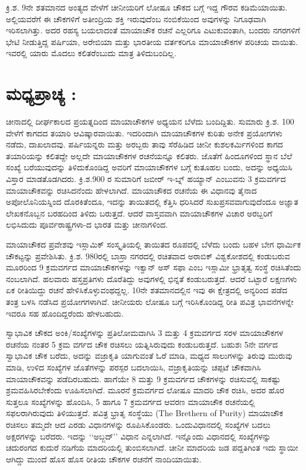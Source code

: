 ಕ್ರಿ.ಶ. 9ನೇ ಶತಮಾನದ ಅಂತ್ಯದ ವೇಳೆಗೆ ಚೀನೀಯರಿಗೆ ಲೋಷೂ ಚೌಕದ ಬಗ್ಗೆ ಇದ್ದ ಗೌರವ ಕಡಿಮೆಯಾಯಿತು. ಅಲ್ಲಿಯವರೆಗೆ ಈ ಚೌಕಗಳಿಗೆ ಅತೀಂದ್ರಿಯ ಶಕ್ತಿ ಇರುವುದೆಂಬ ನಂಬಿಕೆಯಿಂದ ಅವುಗಳನ್ನು ನಿಗೂಢವಾಗಿ ಇರಿಸಲಾಗಿತ್ತು. ಅದರ ರಹಸ್ಯ ಬಯಲಾದಂತೆ ಮಾಯಾಚೌಕ ರಚನೆ ಎಲ್ಲರಿಗೂ ಎಟುಕುವಂತಾಗಿ, ಬಂದರು ನಗರಗಳಿಗೆ ಭೇಟಿ ನೀಡುತ್ತಿದ್ದ ಪರ್ಷಿಯಾ, ಅರೇಬಿಯಾ ಮತ್ತು ಭಾರತೀಯ ವರ್ತಕರಿಗೂ ಮಾಯಾಚೌಕಗಳ ಪರಿಚಯ ವಾಯಿತು. ಇವರಲ್ಲಿ ಯಾರು ಮೊದಲು ಕಲಿತರೆಂಬುದು ಮಾತ್ರ ತಿಳಿದುಬಂದಿಲ್ಲ.

\section*{ಮಧ್ಯಪ್ರಾಚ್ಯ :}

ಚೀನಾದಲ್ಲಿ ದೀರ್ಘಕಾಲದ ಪ್ರಯತ್ನದಿಂದ ಮಾಯಾಚೌಕಗಳ ಅಧ್ಯಯನ ಬೆಳೆದು ಬಂದಿದ್ದಿತು. ಸುಮಾರು ಕ್ರಿ.ಶ. 100 ವೇಳೆಗೆ ಕಾಗದದ ತಯಾರಿ ಆವಿಷ್ಕಾರವಾಯಿತು. ಇದರಿಂದಾಗಿ ಮಾಯಾಚೌಕಗಳ ಕುರಿತು ಅನೇಕ ಪ್ರಯೋಗಗಳು ನಡೆದು, ದಾಖಲಾದವು. ಪರ್ಷಿಯನ್ನರು ಮತ್ತು ಅರಬ್ಬರು ತಾವು ಸೆರೆಹಿಡಿದ ಚೀನೀ ಕುಶಲಕರ್ಮಿಗಳಿಂದ ಕಾಗದ ತಯಾರಿಯನ್ನು ಕಲಿತದ್ದೇ ಅಲ್ಲದೇ ಮಾಯಾಚೌಕಗಳ ರಚನೆಯನ್ನೂ ಕಲಿತರು. ಜೊತೆಗೆ ಹಿಂದೂಗಳಿಂದ ಸ್ಥಾನ ಬೆಲೆ ಸಂಖ್ಯೆ ಬರೆಯುವುದನ್ನು ತಿಳಿದುಕೊಂಡಿದ್ದ ಅವರಿಗೆ ಮಾಯಾಚೌಕಗಳ ಬಗ್ಗೆ ಕುತೂಹಲ ಬಂದು, ಅದನ್ನು ಅಧ್ಯಯಿಸಿ ವಿಸ್ತಾರ ಮಾಡತೊಡಗಿದರು. ಕ್ರಿ.ಶ.900 ರ ಸುಮಾರಿಗೆ ಜಬೀರ್ ಇ-ಬ್ನ್ ಹಯ್ಯಾನ್ ಎಂಬುವನು 3 ಕ್ರಮವರ್ಗದ ಮಾಯಾಚೌಕವನ್ನು ರಚಿಸಿದನೆಂದು ಹೇಳಲಾಗಿದೆ. ಮಾಯಾಚೌಕದ ರಚನೆಯ ಈ ವಿಧಾನವು ತೈನಾದ ಅಪೋಲೊನಿಯಸ್ನಿಂದ ದೊರಕಿತೆಂದೂ, ಇದನ್ನು ತಾಯಿತದಲ್ಲಿ ಕೆತ್ತಿಸಿ ಧರಿಸಿದರೆ ಸುಖಪ್ರಸವವಾಗುವುದೆಂದೂ ಅಜ್ಞಾತ ಲೇಖಕನೊಬ್ಬನ ಬರಹದಿಂದ ತಿಳಿದು ಬರುತ್ತದೆ. ಆದರೆ ವಾಸ್ತವವಾಗಿ ಮಾಯಾಚೌಕಗಳ ವಿಚಾರ ಅರಬ್ಬರಿಗೆ ಲಭಿಸಿದುದು ಪೂರ್ವರಾಷ್ಟ್ರಗಳಾ-ದ ಭಾರತ ಮತ್ತು ಚೀನಾಗಳಿಂದ.

ಮಾಯಾಚೌಕದ ಪ್ರವೇಶವು ಇಸ್ಲಾಮಿಕ್ ಸಂಸ್ಕೃತಿಯಲ್ಲಿ ತಾಯಿತದ ರೂಪದಲ್ಲಿ ಬೆಳೆದು ಬಂದು ಬಹಳ ಬೇಗ ಧಾರ್ಮಿಕ ಚೌಕಟ್ಟನ್ನು ಪ್ರವೇಶಿಸಿತು. ಕ್ರಿ.ಶ. 980ರಲ್ಲಿ ಬಾಸ್ರಾ ನಗರದಲ್ಲಿ ರಚಿತವಾದ ಅರಾಬಿಕ್ ವಿಶ್ವಕೋಶದಲ್ಲಿ ಕಂಡುಬರುವ ಮೂರರಿಂದ 9 ಕ್ರಮವರ್ಗದ ಮಾಯಾಚೌಕಗಳನ್ನು ಇಕ್ವಾನ್ ಅಸ್ ಸಫಾ ಎಂಬ ಇಸ್ಲಾಮೀ ಭ್ರಾತೃತ್ವ ಸಂಸ್ಥೆ ರಚಿಸಿತೆಂದು ನಂಬಲಾಗಿದೆ. ಹಲವಾರು ಹಸ್ತಪ್ರತಿಗಳು ದೊರೆತಿದ್ದು ಅವುಗಳಲ್ಲಿ ಭಿನ್ನತೆ ಕಂಡುಬರುತ್ತದೆ. ಆದರೆ ಒಟ್ಟಾರೆ ಲಕ್ಷಣಗಳು ಏಕ ರೀತಿಯಿದ್ದು ರಚನೆ ಹೇಳಿಸಿಕೊಳ್ಳುವಂಥದ್ದಲ್ಲ. 10ನೇ ಶತಮಾನದಲ್ಲಿನ ಇವು ಈ ಕ್ಷೇತ್ರದಲ್ಲಿ ಅನ್ಯರಿಂದ ಪಡೆದ ತಂತ್ರ ಬಳಸಿ ನಡೆಸಿದ ಪ್ರಯೋಗಗಳಾಗಿವೆ. ಚೀನೀಯರು ಲೋಷೂ ಬಗ್ಗೆ ಇರಿಸಿಕೊಂಡಿದ್ದ ರೀತಿ ಪವಿತ್ರ ಭಾವನೆಗಳನ್ನೇ ಇವರೂ ಸಹ ಹೊಂದಿದ್ದರೆಂದು ಹೇಳಬಹುದು.

ಸ್ವಾಭಾವಿಕ ಚೌಕದ ಅಂಕಿ/ಸಂಖ್ಯೆಗಳನ್ನು ಪ್ರತಿಲೋಮವಾಗಿಸಿ 3 ಮತ್ತು 4 ಕ್ರಮವರ್ಗದ ಸರಳ ಮಾಯಾಚೌಕಗಳ ರಚನೆಯ ನಂತರ 5 ಕ್ರಮ ವರ್ಗದ ಚೌಕ ರಚಿಸಲು ಯತ್ನಿಸಿರುವುದು ಕಂಡುಬರುತ್ತದೆ. ಬಹುಶಃ 5ನೇ ವರ್ಗದ ಸ್ವಾಭಾವಿಕ ಚೌಕ ಬರೆದು, ಅದನ್ನು ವಜ್ರಾಕೃತಿ ಯಾಗುವಂತೆ ಓರೆ ಮಾಡಿ, ಮಧ್ಯದ ಸಾಲುಗಳನ್ನು ತಿರುವು ಮುರುವು ಮಾಡಿ, ಉಳಿದ ಸಂಖ್ಯೆಗಳ ಜೊತೆಗಳನ್ನು ಪರಸ್ಪರ ಬದಲಾಯಿಸಿ, ವಜ್ರಾಕೃತಿಯನ್ನು ಚಪ್ಪಟೆ ಚೌಕವಾಗಿಸಿ ಮಾಯಾಚೌಕವನ್ನು ಪಡೆದಿರಬಹುದು. ಹಾಗೆಯೇ 8 ಮತ್ತು 9 ಕ್ರಮವರ್ಗದ ಚೌಕಗಳನ್ನು ರಚಿಸುವಲ್ಲಿ ಸಾಕಷ್ಟು ಶ್ರಮವಹಿಸಿರಬೇಕೆಂದು ಊಹಿಸಲಾಗಿದೆ. ಮೂರನೆ ಕ್ರಮವರ್ಗದ ಲೋಷೂ ಮಾದರಿ ಚೌಕ
ರಚಿಸಿ, ಅದರ ಹೊರ ಸುತ್ತಲೂ ಸಂಖ್ಯೆಗಳನ್ನು ಹೊಂದಿಸಿ, 5 ಹಾಗೂ 7 ಕ್ರಮವರ್ಗದ ಆವರಣ ಮಾಯಾಚೌಕ ರಚನೆಯಲ್ಲಿ ಸಫಲರಾಗಿರುವುದು ತಿಳಿಯುತ್ತದೆ. ಪವಿತ್ರ ಭ್ರಾತೃ ಸಂಸ್ಥೆಯು (The Brethern of Purity) ಮಾಯಾಚೌಕ ರಚಿಸಲು ತಮ್ಮದೇ ಆದ ಎರಡು ವಿಧಾನಗಳನ್ನು ರೂಪಿಸಿಕೊಂಡರು. ಒಂದುವಿಧಾನದಲ್ಲಿ ಸಂಖ್ಯೆಗಳ ಬದಲು ಅಕ್ಷರಗಳನ್ನು ಬರೆದರು. ಇದನ್ನು ‘‘ಅಬ್ಜದ್’’ ವಿಧಾನ ಎನ್ನಲಾಗಿದೆ. ಇನ್ನೊಂದು ವಿಧಾನದಲ್ಲಿ ಸಂಖ್ಯೆಗಳನ್ನು ಚದುರಂಗದ ಕುದುರೆ ನಡಿಗೆಯ ಮಾದರಿಯಲ್ಲಿ ತುಂಬಿಸಲಾಗಿದೆ. ಚೀನೀ ಮಾದರಿಯ ಜಡ ಪದ್ದತಿಗಿಂತ ಇದು ಸ್ಥಾಯೀ ಆಗಿದ್ದು ಮುಂದೆ ಹೊಸ ಹೊಸ ರೀತಿಯ ಚೌಕಗಳ ರಚನೆಗೆ ನಾಂದಿಯಾಯಿತು.

